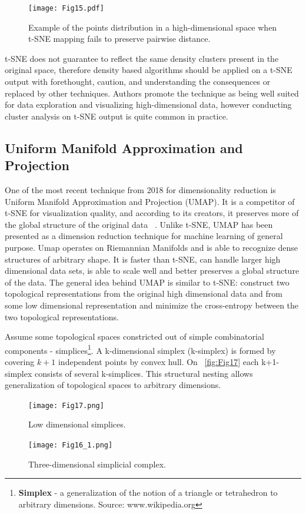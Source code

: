 \begin{figure}[!hp]
    \centering
    \texttt{[image: Fig15.pdf]}
    \caption{Example of the points distribution in a high-dimensional space when t-SNE mapping fails to preserve pairwise distance.}
    \label{fig:Fig15}
\end{figure}

t-SNE does not guarantee to reflect the same density clusters present in the original space, therefore density based algorithms should be applied on a t-SNE output with forethought, caution, and understanding the consequences or replaced by other techniques. Authors promote the technique as being well suited for data exploration and visualizing high-dimensional data, however conducting cluster analysis on t-SNE output is quite common in practice.

\subsection{Uniform Manifold Approximation and Projection}
One of the most recent technique from 2018 for dimensionality reduction is Uniform Manifold Approximation and Projection (UMAP). It is a competitor of t-SNE for visualization quality, and according to its creators, it preserves more of the global structure of the original data ~\cite{mcinnes2018umap}. Unlike t-SNE, UMAP has been presented as a dimension reduction technique for machine learning of general purpose.
Umap operates on Riemannian Manifolds and is able to recognize dense structures of arbitrary shape. It is faster than t-SNE, can handle larger high dimensional data sets, is able to scale well and better preserves a global structure of the data. 
The general idea behind UMAP is similar to t-SNE: construct two topological representations from the original high dimensional data and from some low dimensional representation and minimize the cross-entropy between the two topological representations. 

Assume some topological spaces constricted out of simple combinatorial components - simplices\footnote{\textbf{Simplex} - a generalization of the notion of a triangle or tetrahedron to arbitrary dimensions. Source: www.wikipedia.org}. A k-dimensional simplex (k-simplex) is formed by covering $k+1$ independent points by convex hull. On ~\autoref{fig:Fig17} each k+1-simplex consists of several k-simplices. This structural nesting allows generalization of topological spaces to arbitrary dimensions.

\begin{figure}[!hp]
    \centering
    \begin{minipage}{0.45\textwidth}
        \centering
        \texttt{[image: Fig17.png]}
        \caption{Low dimensional simplices.}
        \label{fig:Fig17}
    \end{minipage}\hfill
    \begin{minipage}{0.45\textwidth}
        \centering
        \texttt{[image: Fig16\_1.png]} 
        \caption{Three-dimensional simplicial complex.}
        \label{fig:Fig16}
    \end{minipage}
\end{figure}

